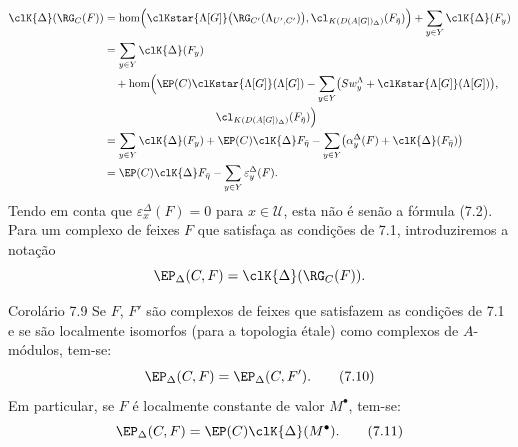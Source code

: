 \[
\begin{aligned}
\clK{\Delta}(\RG_C(F))
&=\operatorname{hom}\Bigl(
\clKstar{\Lambda[G]}\bigl(\RG_{C'}(\Lambda_{U',C'})\bigr),
\cl_{K(D(A[G])_\Delta)}(F_{\bar\eta})\Bigr)
 +\sum_{y\in Y}\clK{\Delta}(F_y)\\
&=\sum_{y\in Y}\clK{\Delta}(F_y)\\
&\quad +\operatorname{hom}\Bigl(
\EP(C)\clKstar{\Lambda[G]}(\Lambda[G])
 -\sum_{y\in Y}\bigl(Sw_y^{\Lambda}+\clKstar{\Lambda[G]}(\Lambda[G])\bigr),\\
&\hspace{10em}\cl_{K(D(A[G])_\Delta)}(F_{\bar\eta})\Bigr)\\
&=\sum_{y\in Y}\clK{\Delta}(F_y)
 +\EP(C)\clK{\Delta}F_{\bar\eta}
 -\sum_{y\in Y}\bigl(\alpha_y^\Delta(F)+\clK{\Delta}(F_{\bar\eta})\bigr)\\
&=\EP(C)\clK{\Delta}F_{\bar\eta}
 -\sum_{y\in Y}\varepsilon_y^\Delta(F).
\end{aligned}
\]
Tendo em conta que $\varepsilon_x^\Delta(F)=0$ para $x\in\mathcal U$, esta não é senão a fórmula (7.2). Para um complexo de feixes $F$ que satisfaça as condições de 7.1, introduziremos a notação
\[
\EP_\Delta(C,F)=\clK{\Delta}(\RG_C(F)).
\]

\begin{statement}{Corolário 7.9}
Se $F$, $F'$ são complexos de feixes que satisfazem as condições de 7.1 e se são localmente isomorfos (para a topologia étale) como complexos de $A$-módulos, tem-se:
\[
\EP_\Delta(C,F)=\EP_\Delta(C,F').
\tag{7.10}
\]
Em particular, se $F$ é localmente constante de valor $M^\bullet$, tem-se:
\[
\EP_\Delta(C,F)=\EP(C)\clK{\Delta}(M^\bullet).
\tag{7.11}
\]
\end{statement}
